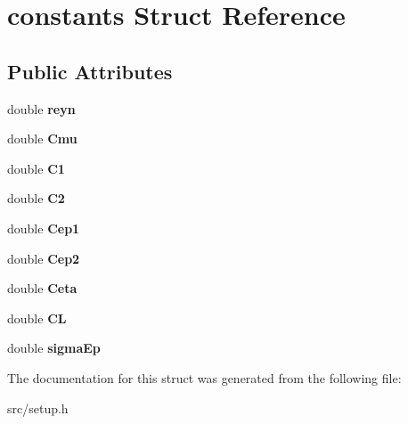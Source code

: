 \hypertarget{structconstants}{
\section{constants Struct Reference}
\label{structconstants}
}
\subsection*{Public Attributes}
\begin{DoxyCompactItemize}
\item 
\hypertarget{structconstants_a68738fe4ec421ad4e0be4ed19501f15a}{
double {\bfseries reyn}}
\label{structconstants_a68738fe4ec421ad4e0be4ed19501f15a}

\item 
\hypertarget{structconstants_a382f58fd997f76cf1ca691938ad5866e}{
double {\bfseries Cmu}}
\label{structconstants_a382f58fd997f76cf1ca691938ad5866e}

\item 
\hypertarget{structconstants_ad28e357065ee396d1ea2294f866e9c5b}{
double {\bfseries C1}}
\label{structconstants_ad28e357065ee396d1ea2294f866e9c5b}

\item 
\hypertarget{structconstants_a3f85ef7fcf04220babce769a49e0b927}{
double {\bfseries C2}}
\label{structconstants_a3f85ef7fcf04220babce769a49e0b927}

\item 
\hypertarget{structconstants_a60f29932f9847bce524357661aa5387f}{
double {\bfseries Cep1}}
\label{structconstants_a60f29932f9847bce524357661aa5387f}

\item 
\hypertarget{structconstants_a28b0b323e3b3173072a5eaf2f89c8a1d}{
double {\bfseries Cep2}}
\label{structconstants_a28b0b323e3b3173072a5eaf2f89c8a1d}

\item 
\hypertarget{structconstants_ae8cf7b40da68d2ee9f12f6c0c6cc49cc}{
double {\bfseries Ceta}}
\label{structconstants_ae8cf7b40da68d2ee9f12f6c0c6cc49cc}

\item 
\hypertarget{structconstants_a34749e68de59046dca2df37cc428d07c}{
double {\bfseries CL}}
\label{structconstants_a34749e68de59046dca2df37cc428d07c}

\item 
\hypertarget{structconstants_ab3ea508d07fee667fcd4dd2331d73634}{
double {\bfseries sigmaEp}}
\label{structconstants_ab3ea508d07fee667fcd4dd2331d73634}

\end{DoxyCompactItemize}


The documentation for this struct was generated from the following file:\begin{DoxyCompactItemize}
\item 
src/setup.h\end{DoxyCompactItemize}
